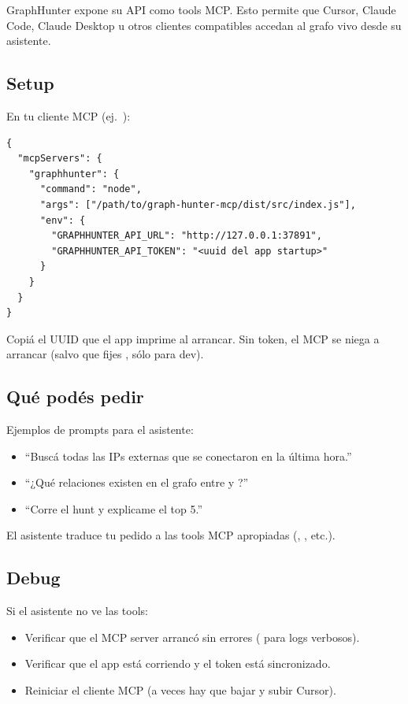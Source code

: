 GraphHunter expone su API como tools MCP. Esto permite que Cursor,
Claude Code, Claude Desktop u otros clientes compatibles accedan
al grafo vivo desde su asistente.

\subsection{Setup}

En tu cliente MCP (ej.\ ):

\begin{lstlisting}[basicstyle=\ttfamily\small]
{
  "mcpServers": {
    "graphhunter": {
      "command": "node",
      "args": ["/path/to/graph-hunter-mcp/dist/src/index.js"],
      "env": {
        "GRAPHHUNTER_API_URL": "http://127.0.0.1:37891",
        "GRAPHHUNTER_API_TOKEN": "<uuid del app startup>"
      }
    }
  }
}
\end{lstlisting}

Copiá el UUID que el app imprime al arrancar. Sin token, el MCP se
niega a arrancar (salvo que fijes
, sólo para dev).

\subsection{Qué podés pedir}

Ejemplos de prompts para el asistente:

\begin{itemize}
    \item ``Buscá todas las IPs externas que se conectaron en la
    última hora.''
    \item ``¿Qué relaciones existen en el grafo entre 
    y ?''
    \item ``Corre el hunt  y explicame el top 5.''
\end{itemize}

El asistente traduce tu pedido a las tools MCP apropiadas
(, , etc.).

\subsection{Debug}

Si el asistente no ve las tools:

\begin{itemize}
    \item Verificar que el MCP server arrancó sin errores
    ( para logs verbosos).
    \item Verificar que el app está corriendo y el token está
    sincronizado.
    \item Reiniciar el cliente MCP (a veces hay que bajar y subir
    Cursor).
\end{itemize}

